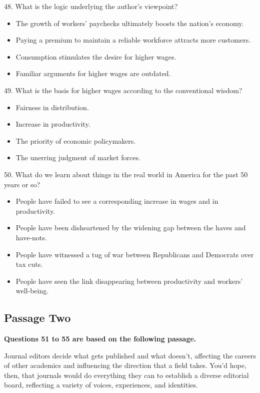 \documentclass[UTF8,11pt]{ctexart}
\begin{document}
48. What is the logic underlying the author’s viewpoint?


\begin{itemize}[leftmargin=2em,itemsep=.2em,topsep=.4em]\item[A.] The growth of workers’ paychecks ultimately boosts the nation’s economy.
\item[B.] Paying a premium to maintain a reliable workforce attracts more customers.
\item[C.] Consumption stimulates the desire for higher wages.
\item[D.] Familiar arguments for higher wages are outdated.
\end{itemize}

49. What is the basis for higher wages according to the conventional wisdom?


\begin{itemize}[leftmargin=2em,itemsep=.2em,topsep=.4em]\item[A.] Fairness in distribution.
\item[B.] Increase in productivity.
\item[C.] The priority of economic policymakers.
\item[D.] The unerring judgment of market forces.
\end{itemize}

50. What do we learn about things in the real world in America for the past 50 years or so?


\begin{itemize}[leftmargin=2em,itemsep=.2em,topsep=.4em]\item[A.] People have failed to see a corresponding increase in wages and in productivity.
\item[B.] People have been disheartened by the widening gap between the haves and have-nots.
\item[C.] People have witnessed a tug of war between Republicans and Democrats over tax cuts.
\item[D.] People have seen the link disappearing between productivity and workers’ well-being.
\end{itemize}

\subsection*{\textbf{Passage Two}}


\textbf{Questions 51 to 55 are based on the following passage.}


Journal editors decide what gets published and what doesn’t, affecting the careers of other academics and influencing the direction that a field takes. You’d hope, then, that journals would do everything they can to establish a diverse editorial board, reflecting a variety of voices, experiences, and identities.
\end{document}
